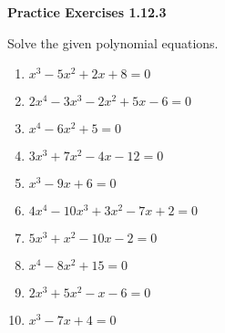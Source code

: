 \vspace{0.3ex}
\noindent\textbf{Practice Exercises 1.12.3}

\vspace{0.2ex}

Solve the given polynomial equations.
\begin{multicols}{2}
\begin{enumerate}
    \item $x^3 - 5x^2 + 2x + 8 = 0$
    \item $2x^4 - 3x^3 - 2x^2 + 5x - 6 = 0$
    \item $x^4 - 6x^2 + 5 = 0$
    \item $3x^3 + 7x^2 - 4x - 12 = 0$
    \item $x^3 - 9x + 6 = 0$
    \item $4x^4 - 10x^3 + 3x^2 - 7x + 2 = 0$
    \item $5x^3 + x^2 - 10x - 2 = 0$
    \item $x^4 - 8x^2 + 15 = 0$
    \item $2x^3 + 5x^2 - x - 6 = 0$
    \item $x^3 - 7x + 4 = 0$
    \end{enumerate}
    \end{multicols}
